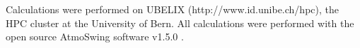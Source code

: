 \documentclass{ametsoc}
\begin{document}
	Calculations were performed on UBELIX (http://www.id.unibe.ch/hpc), the HPC cluster at the University of Bern. All calculations were performed with the open source AtmoSwing software v1.5.0 \citep{Horton2017a}.
	
	
	
	
	
	
	
	
	
	
	
\end{document}
